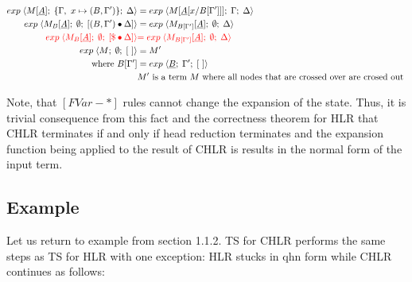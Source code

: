 \documentclass[a4paper, 10pt]{article}
\begin{document}
\begin{align}
  \label{exp11} exp\; \langle M[\underline{A}];\; \{\Gamma,\ x \mapsto (B, \Gamma')\};\; \Delta \rangle
  &= exp\; \langle M[\underline{A}[x / B[\Gamma']]];\; \Gamma;\; \Delta \rangle \\
  \label{exp12} exp\; \langle M_B[\underline{A}];\; \emptyset;\; [(B,\Gamma')\bullet\Delta] \rangle
  &= exp\; \langle M_{B[\Gamma']}[\underline{A}];\; \emptyset;\; \Delta \rangle\\
  \label{exp13}  {\color{red} exp\; \langle M_B[\underline{A}];\; \emptyset;\;  [\$ \bullet \Delta] \rangle}
  &{\color{red}= exp\; \langle M_{B[\Gamma']}[\underline{A}];\; \emptyset;\; \Delta \rangle } \\
  \label{exp14} exp\; \langle M;\; \emptyset;\; [\ ] \rangle &= M' \\
  \textnormal{where } B[\Gamma'] &= exp\; \langle \underline{B};\; \Gamma';\; [\ ] \rangle \\
  & M' \textnormal{ is a term } M \textnormal{ where all nodes that are crossed over are crosed out }
\end{align}

Note, that $[FVar-*]$ rules cannot change the expansion of the state.
Thus, it is trivial consequence from this fact and  the correctness theorem for HLR that
CHLR terminates if and only if head reduction terminates and the expansion function being applied to
the result of CHLR is results in the normal form of the input term.


\subsection{Example}
Let us return to example from section 1.1.2. TS for CHLR performs the same steps as TS for HLR
with one exception: HLR stucks in qhn form while CHLR continues as follows:
\end{document}
